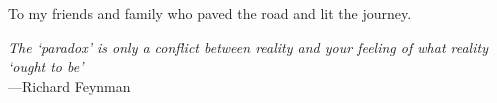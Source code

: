 %
\begin{frontmatter}

%
%
\makefrontmatter

%
%
%
%
%
%
\begin{dedication}
  To my friends and family who paved the road and lit the journey.
\end{dedication}


%
%



%
%
\begin{epigraph} %
  \emph{The `paradox' is only a conflict between reality and your feeling of what reality `ought to be'}\\
  ---Richard Feynman
\end{epigraph}

%



\end{frontmatter}
